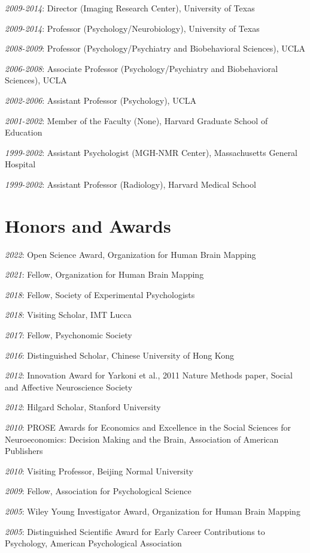 \documentclass[10pt, letterpaper]{article}
\begin{document}
\textit{2009-2014}: Director (Imaging Research Center), University of Texas

\textit{2009-2014}: Professor (Psychology/Neurobiology), University of Texas

\textit{2008-2009}: Professor (Psychology/Psychiatry and Biobehavioral Sciences), UCLA

\textit{2006-2008}: Associate Professor (Psychology/Psychiatry and Biobehavioral Sciences), UCLA

\textit{2002-2006}: Assistant Professor (Psychology), UCLA

\textit{2001-2002}: Member of the Faculty (None), Harvard Graduate School of Education

\textit{1999-2002}: Assistant Psychologist (MGH-NMR Center), Massachusetts General Hospital

\textit{1999-2002}: Assistant Professor (Radiology), Harvard Medical School


\section*{Honors and Awards}
\noindent
\textit{2022}: Open Science Award, Organization for Human Brain Mapping

\textit{2021}: Fellow, Organization for Human Brain Mapping

\textit{2018}: Fellow, Society of Experimental Psychologists

\textit{2018}: Visiting Scholar, IMT Lucca

\textit{2017}: Fellow, Psychonomic Society

\textit{2016}: Distinguished Scholar, Chinese University of Hong Kong

\textit{2012}: Innovation Award for Yarkoni et al., 2011 Nature Methods paper, Social and Affective Neuroscience Society

\textit{2012}: Hilgard Scholar, Stanford University

\textit{2010}: PROSE Awards for Economics and Excellence in the Social Sciences for Neuroeconomics: Decision Making and the Brain, Association of American Publishers

\textit{2010}: Visiting Professor, Beijing Normal University

\textit{2009}: Fellow, Association for Psychological Science

\textit{2005}: Wiley Young Investigator Award, Organization for Human Brain Mapping

\textit{2005}: Distinguished Scientific Award for Early Career Contributions to Psychology, American Psychological Association
\end{document}

